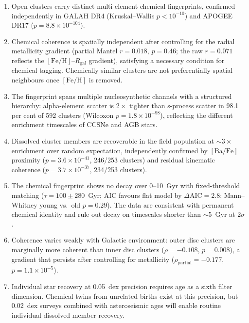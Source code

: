 \documentclass[fleqn,usenatbib]{mnras}
\newcommand{\feh}{$\mathrm{[Fe/H]}$\xspace}
\newcommand{\bafe}{$\mathrm{[Ba/Fe]}$\xspace}
\begin{document}
\begin{enumerate}

\item Open clusters carry distinct multi-element chemical fingerprints, confirmed independently in GALAH DR4 (Kruskal--Wallis $p < 10^{-10}$) and APOGEE DR17 ($p = 8.8 \times 10^{-104}$).

\item Chemical coherence is spatially independent after controlling for the radial metallicity gradient (partial Mantel $r = 0.018$, $p = 0.46$; the raw $r = 0.071$ reflects the \feh--$R_{\mathrm{gal}}$ gradient), satisfying a necessary condition for chemical tagging. Chemically similar clusters are not preferentially spatial neighbours once \feh is removed.

\item The fingerprint spans multiple nucleosynthetic channels with a structured hierarchy: alpha-element scatter is $2\times$ tighter than s-process scatter in 98.1 per cent of 592 clusters (Wilcoxon $p = 1.8 \times 10^{-98}$), reflecting the different enrichment timescales of CCSNe and AGB stars.

\item Dissolved cluster members are recoverable in the field population at ${\sim}3\times$ enrichment over random expectation, independently confirmed by \bafe proximity ($p = 3.6 \times 10^{-41}$, 246/253 clusters) and residual kinematic coherence ($p = 3.7 \times 10^{-37}$, 234/253 clusters).

\item The chemical fingerprint shows no decay over 0--10~Gyr with fixed-threshold matching ($\tau = 100 \pm 280$~Gyr; AIC favours flat model by $\Delta\mathrm{AIC} = 2.8$; Mann--Whitney young vs.\ old $p = 0.29$). The data are consistent with permanent chemical identity and rule out decay on timescales shorter than ${\sim}5$~Gyr at $2\sigma$.

\item Coherence varies weakly with Galactic environment: outer disc clusters are marginally more coherent than inner disc clusters ($\rho = -0.108$, $p = 0.008$), a gradient that persists after controlling for metallicity ($\rho_{\mathrm{partial}} = -0.177$, $p = 1.1 \times 10^{-5}$).

\item Individual star recovery at 0.05~dex precision requires age as a sixth filter dimension. Chemical twins from unrelated births exist at this precision, but 0.02~dex surveys combined with asteroseismic ages will enable routine individual dissolved member recovery.

\end{enumerate}
\end{document}
